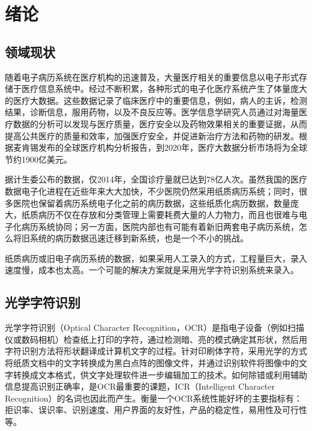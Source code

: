 ﻿\chapter{绪论}
\label{chap:introduction}

\section{领域现状}
随着电子病历系统在医疗机构的迅速普及，大量医疗相关的重要信息以电子形式存储于医疗信息系统中。经过不断积累，各种形式的电子化医疗系统产生了体量庞大的医疗大数据。这些数据记录了临床医疗中的重要信息，例如，病人的主诉，检测结果，诊断信息，服用药物，以及不良反应等。医学信息学研究人员通过对海量医疗数据的分析可以发现与医疗质量，医疗安全以及药物效果相关的重要证据，从而提高公共医疗的质量和效率，加强医疗安全，并促进新治疗方法和药物的研发。根据麦肯锡发布的全球医疗机构分析报告，到2020年，医疗大数据分析市场将为全球节约1900亿美元。%

据计生委公布的数据，仅2014年，全国诊疗量就已达到78亿人次。虽然我国的医疗数据电子化进程在近些年来大大加快，不少医院仍然采用纸质病历系统；同时，很多医院也保留着病历系统电子化之前的病历数据，这些纸质化病历数据，数量庞大，纸质病历不仅在存放和分类管理上需要耗费大量的人力物力，而且也很难与电子化病历系统协同；另一方面，医院内部也有可能有着新旧两套电子病历系统，怎么将旧系统的病历数据迅速迁移到新系统，也是一个不小的挑战。

纸质病历或旧电子病历系统的数据，如果采用人工录入的方式，工程量巨大，录入速度慢，成本也太高。一个可能的解决方案就是采用光学字符识别系统来录入。

\section{光学字符识别}
光学字符识别（Optical Character Recognition，OCR）是指电子设备（例如扫描仪或数码相机）检查纸上打印的字符，通过检测暗、亮的模式确定其形状，然后用字符识别方法将形状翻译成计算机文字的过程\citep{mori1992historical}。针对印刷体字符，采用光学的方式将纸质文档中的文字转换成为黑白点阵的图像文件，并通过识别软件将图像中的文字转换成文本格式，供文字处理软件进一步编辑加工的技术。如何除错或利用辅助信息提高识别正确率，是OCR最重要的课题，ICR（Intelligent Character Recognition）的名词也因此而产生。衡量一个OCR系统性能好坏的主要指标有：拒识率、误识率、识别速度、用户界面的友好性，产品的稳定性，易用性及可行性等。%

